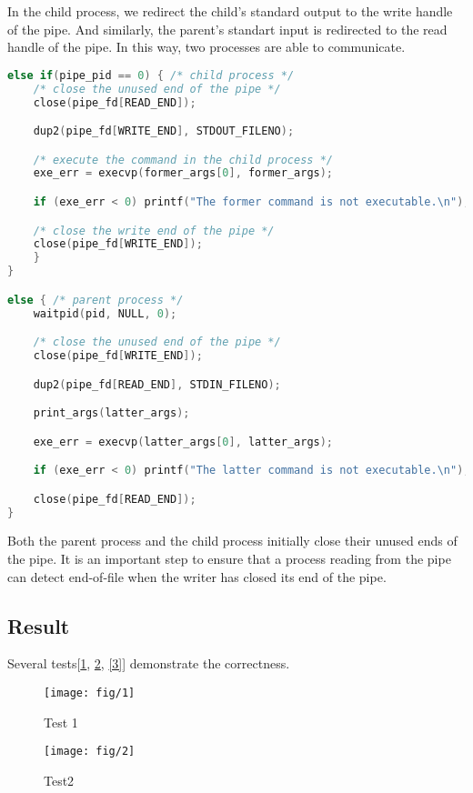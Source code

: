 \documentclass{article}
\begin{document}
In the child process, we redirect the child's standard output to the write handle of the pipe. And similarly, the parent's standart input is redirected to the read handle of the pipe. In this way, two processes are able to communicate. 

\begin{lstlisting}[language=c, caption={pipe()-II}, captionpos=b]
else if(pipe_pid == 0) { /* child process */
    /* close the unused end of the pipe */
    close(pipe_fd[READ_END]);

    dup2(pipe_fd[WRITE_END], STDOUT_FILENO);

    /* execute the command in the child process */
    exe_err = execvp(former_args[0], former_args); 

    if (exe_err < 0) printf("The former command is not executable.\n");

    /* close the write end of the pipe */
    close(pipe_fd[WRITE_END]);
    }
}

else { /* parent process */
    waitpid(pid, NULL, 0);

    /* close the unused end of the pipe */
    close(pipe_fd[WRITE_END]);

    dup2(pipe_fd[READ_END], STDIN_FILENO);

    print_args(latter_args);

    exe_err = execvp(latter_args[0], latter_args);

    if (exe_err < 0) printf("The latter command is not executable.\n");

    close(pipe_fd[READ_END]);
}
\end{lstlisting}

Both the parent process and the child process initially
close their unused ends of the pipe. It is an important step to ensure that a process
reading from the pipe can detect end-of-file when the writer
has closed its end of the pipe.

\subsection*{Result}
Several tests[\ref{1}, \ref{2}, \ref{3}] demonstrate the correctness.

\begin{figure}[h]
    \centering
    
    \texttt{[image: fig/1]}
    \caption{Test 1}
    \label{1}
\end{figure}

\begin{figure}[h]
    \centering
    
    \texttt{[image: fig/2]}
    \caption{Test2}
    \label{2}
\end{figure}
\end{document}
